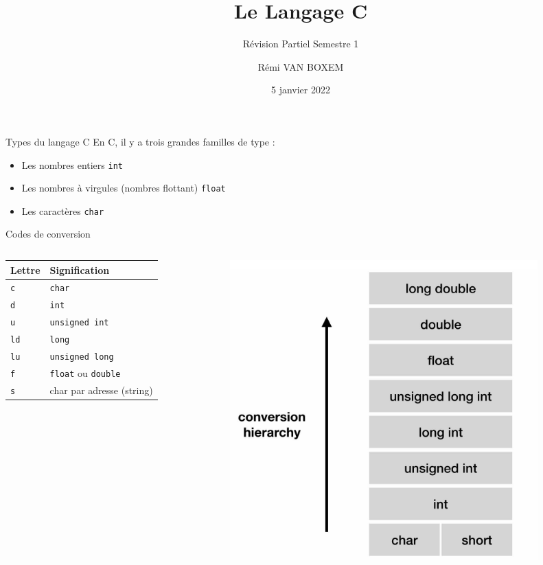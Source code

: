 \documentclass[
  10pt,
  french,
  ignorenonframetext,
  aspectratio=169,
]{beamer}
\title{Le Langage C}
\subtitle{Révision Partiel Semestre 1}
\author{Rémi VAN BOXEM}
\date{5 janvier 2022}
\institute{Junia ISEN}
\providecommand{\tightlist}{%
  \setlength{\itemsep}{0pt}\setlength{\parskip}{0pt}}
\begin{document}
\frame{\titlepage}

\begin{frame}[fragile]{Types du langage C}
\protect\hypertarget{types-du-langage-c}{}
En C, il y a trois grandes familles de type :

\begin{itemize}
\tightlist
\item
  Les nombres entiers \texttt{int}
\item
  Les nombres à virgules (nombres flottant) \texttt{float}
\item
  Les caractères \texttt{char}
\end{itemize}
\end{frame}

\begin{frame}[fragile]{Codes de conversion}
\protect\hypertarget{codes-de-conversion}{}
\begin{columns}[T]
\begin{column}{0.48\textwidth}
\begin{longtable}[]{@{}ll@{}}
\toprule
Lettre & Signification \\
\midrule
\endhead
\texttt{c} & \texttt{char} \\
\texttt{d} & \texttt{int} \\
\texttt{u} & \texttt{unsigned\ int} \\
\texttt{ld} & \texttt{long} \\
\texttt{lu} & \texttt{unsigned\ long} \\
\texttt{f} & \texttt{float} ou \texttt{double} \\
\texttt{s} & char par adresse (string) \\
\bottomrule
\end{longtable}
\end{column}

\begin{column}{0.48\textwidth}
\includegraphics{img/type-conversion.png}
\end{column}
\end{columns}
\end{frame}
\end{document}
